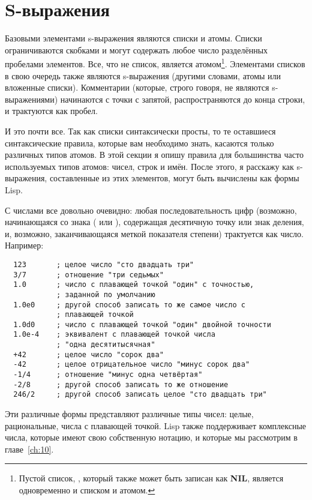 \section{S-выражения}

Базовыми элементами s-выражения являются списки и атомы. Списки ограничиваются скобками и
могут содержать любое число разделённых пробелами элементов. Все, что не список, является
атомом\footnote{Пустой список, \code{()}, который также может быть записан как
  \textbf{NIL}, является одновременно и списком и атомом.}. Элементами списков в свою
очередь также являются s-выражения (другими словами, атомы или вложенные
списки). Комментарии (которые, строго говоря, не являются s-выражениями) начинаются с
точки с запятой, распространяются до конца строки, и трактуются как пробел.

И это почти все. Так как списки синтаксически просты, то те оставшиеся синтаксические
правила, которые вам необходимо знать, касаются только различных типов атомов. В этой
секции я опишу правила для большинства часто используемых типов атомов: чисел, строк и
имён. После этого, я расскажу как s-выражения, составленные из этих элементов, могут быть
вычислены как формы Lisp.

С числами все довольно очевидно: любая последовательность цифр (возможно, начинающаяся со
знака (\code{+} или \code{-}), содержащая десятичную точку или знак деления, и, возможно,
заканчивающаяся меткой показателя степени) трактуется как число. Например:

\begin{lstlisting}
  123       ; целое число "сто двадцать три"
  3/7       ; отношение "три седьмых"
  1.0       ; число с плавающей точкой "один" с точностью, 
            ; заданной по умолчанию
  1.0e0     ; другой способ записать то же самое число с
            ; плавающей точкой
  1.0d0     ; число с плавающей точкой "один" двойной точности
  1.0e-4    ; эквивалент с плавающей точкой числа
            ; "одна десятитысячная"
  +42       ; целое число "сорок два"
  -42       ; целое отрицательное число "минус сорок два"
  -1/4      ; отношение "минус одна четвёртая"
  -2/8      ; другой способ записать то же отношение
  246/2     ; другой способ записать целое "сто двадцать три"
\end{lstlisting}

Эти различные формы представляют различные типы чисел: целые, рациональные, числа с
плавающей точкой. Lisp также поддерживает комплексные числа, которые имеют свою
собственную нотацию, и которые мы рассмотрим в главе~\ref{ch:10}.

